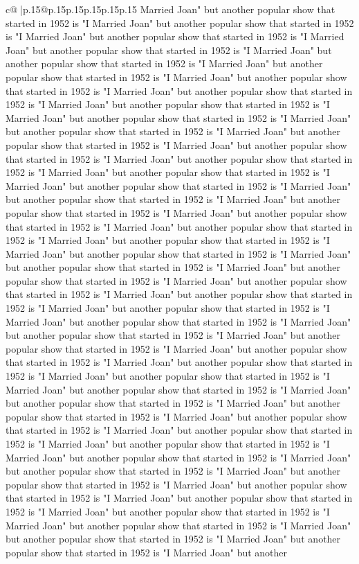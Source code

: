 \documentclass{article}
\begin{document}
{\begin{supertabular}{c@{$\;$}|p{.15\linewidth}@{}p{.15\linewidth}p{.15\linewidth}p{.15\linewidth}p{.15\linewidth}p{.15\linewidth}}
{{{Married Joan" but another popular show that started in 1952 is "I Married Joan" but another popular show that started in 1952 is "I Married Joan" but another popular show that started in 1952 is "I Married Joan" but another popular show that started in 1952 is "I Married Joan" but another popular show that started in 1952 is "I Married Joan" but another popular show that started in 1952 is "I Married Joan" but another popular show that started in 1952 is "I Married Joan" but another popular show that started in 1952 is "I Married Joan" but another popular show that started in 1952 is "I Married Joan" but another popular show that started in 1952 is "I Married Joan" but another popular show that started in 1952 is "I Married Joan" but another popular show that started in 1952 is "I Married Joan" but another popular show that started in 1952 is "I Married Joan" but another popular show that started in 1952 is "I Married Joan" but another popular show that started in 1952 is "I Married Joan" but another popular show that started in 1952 is "I Married Joan" but another popular show that started in 1952 is "I Married Joan" but another popular show that started in 1952 is "I Married Joan" but another popular show that started in 1952 is "I Married Joan" but another popular show that started in 1952 is "I Married Joan" but another popular show that started in 1952 is "I Married Joan" but another popular show that started in 1952 is "I Married Joan" but another popular show that started in 1952 is "I Married Joan" but another popular show that started in 1952 is "I Married Joan" but another popular show that started in 1952 is "I Married Joan" but another popular show that started in 1952 is "I Married Joan" but another popular show that started in 1952 is "I Married Joan" but another popular show that started in 1952 is "I Married Joan" but another popular show that started in 1952 is "I Married Joan" but another popular show that started in 1952 is "I Married Joan" but another popular show that started in 1952 is "I Married Joan" but another popular show that started in 1952 is "I Married Joan" but another popular show that started in 1952 is "I Married Joan" but another popular show that started in 1952 is "I Married Joan" but another popular show that started in 1952 is "I Married Joan" but another popular show that started in 1952 is "I Married Joan" but another popular show that started in 1952 is "I Married Joan" but another popular show that started in 1952 is "I Married Joan" but another popular show that started in 1952 is "I Married Joan" but another popular show that started in 1952 is "I Married Joan" but another popular show that started in 1952 is "I Married Joan" but another popular show that started in 1952 is "I Married Joan" but another popular show that started in 1952 is "I Married Joan" but another popular show that started in 1952 is "I Married Joan" but another popular show that started in 1952 is "I Married Joan" but another popular show that started in 1952 is "I Married Joan" but another popular show that started in 1952 is "I Married Joan" but another popular show that started in 1952 is "I Married Joan" but another }}}
\end{supertabular}}
\end{document}

